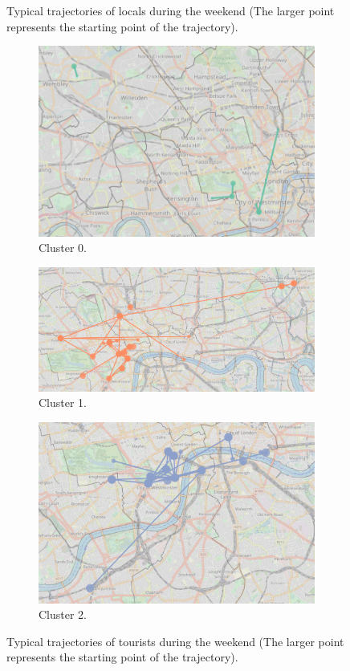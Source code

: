 \documentclass{article}
\theoremstyle{definition}
\theoremstyle{remark}
\begin{document}
\begin{figure}[!h]
\caption{Typical trajectories of locals during the weekend (The larger point represents the starting point of the trajectory).}
\label{fig:sequences_weekend_locals}
\end{figure}


\begin{figure}[!h]

\centering
\begin{subfigure}{0.6\textheight}
\centering
\includegraphics[width=0.4\linewidth]{figures/weekend_tourists_c0.png}
\caption{Cluster 0.}
\label{fig:weekend_tourists_c0}
\end{subfigure}
\begin{subfigure}{0.6\textheight}
\centering
\includegraphics[width=0.4\linewidth]{figures/weekend_tourists_c1.png}
\caption{Cluster 1.}
\label{fig:weekend_tourists_c1}
\end{subfigure}
\begin{subfigure}{0.6\textheight}
\centering
\includegraphics[width=0.4\linewidth]{figures/weekend_tourists_c2.png}
\caption{Cluster 2.}
\label{fig:weekend_tourists_c2}
\end{subfigure}

\caption{Typical trajectories of tourists during the weekend (The larger point represents the starting point of the trajectory).}
\label{fig:sequences_weekend_tourists}
\end{figure}

\end{document}
